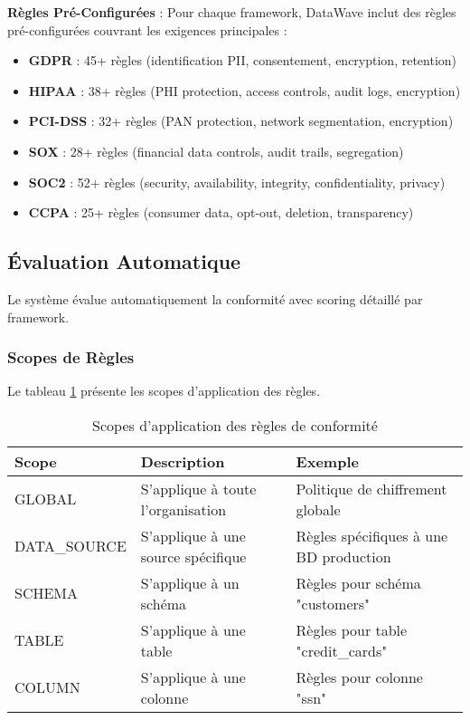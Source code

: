 \textbf{Règles Pré-Configurées} : Pour chaque framework, DataWave inclut des règles pré-configurées couvrant les exigences principales :
\begin{itemize}
    \item \textbf{GDPR} : 45+ règles (identification PII, consentement, encryption, retention)
    \item \textbf{HIPAA} : 38+ règles (PHI protection, access controls, audit logs, encryption)
    \item \textbf{PCI-DSS} : 32+ règles (PAN protection, network segmentation, encryption)
    \item \textbf{SOX} : 28+ règles (financial data controls, audit trails, segregation)
    \item \textbf{SOC2} : 52+ règles (security, availability, integrity, confidentiality, privacy)
    \item \textbf{CCPA} : 25+ règles (consumer data, opt-out, deletion, transparency)
\end{itemize}

\subsection{Évaluation Automatique}

Le système évalue automatiquement la conformité avec scoring détaillé par framework.

\subsubsection{Scopes de Règles}

Le tableau \ref{tab:scopes_regles} présente les scopes d'application des règles.

\begin{table}[htpb]
\centering
\caption{Scopes d'application des règles de conformité}
\label{tab:scopes_regles}
\begin{tabular}{|p{}|p{}|p{}|}
\hline
\textbf{Scope} & \textbf{Description} & \textbf{Exemple} \\
\hline
GLOBAL & S'applique à toute l'organisation & Politique de chiffrement globale \\
\hline
DATA\_SOURCE & S'applique à une source spécifique & Règles spécifiques à une BD production \\
\hline
SCHEMA & S'applique à un schéma & Règles pour schéma "customers" \\
\hline
TABLE & S'applique à une table & Règles pour table "credit\_cards" \\
\hline
COLUMN & S'applique à une colonne & Règles pour colonne "ssn" \\
\hline
\end{tabular}
\end{table}


